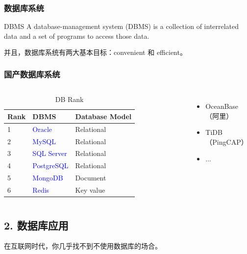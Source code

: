 \documentclass[aspectratio=169, 14pt]{beamer}
\begin{document}
\begin{frame}
	\frametitle{数据库系统}
	\begin{block}{DBMS}
		A database-management system (DBMS) is a collection of interrelated data and a set of programs to access those data.
	\end{block}
	并且，数据库系统有两大基本目标：\alert{convenient} 和 \alert{efficient}。
\end{frame}

\begin{frame}
	\frametitle{国产数据库系统}
	\begin{columns}
		\begin{table}
			\caption{DB Rank}
			\begin{tabular}{lll}
				\toprule
				Rank & DBMS                         & Database Model \\
				\midrule
				1    & \textcolor{blue}{Oracle}     & Relational     \\
				2    & \textcolor{blue}{MySQL}      & Relational     \\
				3    & \textcolor{blue}{SQL Server} & Relational     \\
				4    & \textcolor{blue}{PostgreSQL} & Relational     \\
				5    & \textcolor{blue}{MongoDB}    & Document       \\
				6    & \textcolor{blue}{Redis}      & Key value      \\
				\bottomrule
			\end{tabular}
		\end{table}
		\begin{itemize}
			\item OceanBase （阿里）
			\item TiDB （PingCAP）
			\item ...
		\end{itemize}
	\end{columns}

\end{frame}

\begin{frame}
	\section{\textcolor{darkmidnightblue}{2. 数据库应用}}

	在互联网时代，你几乎找不到不使用数据库的场合。
\end{frame}
\end{document}

